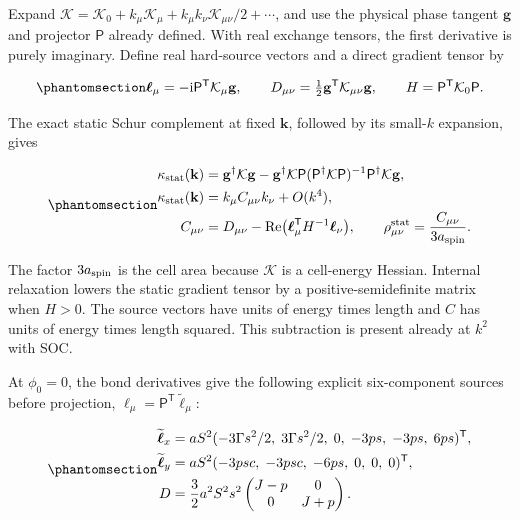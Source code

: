 Expand
\(\mathcal K=\mathcal K_0+k_\mu\mathcal K_\mu+k_\mu k_\nu\mathcal K_{\mu\nu}/2+\cdots\),
and use the physical phase tangent \(\mathbf g\) and projector
\(\mathsf P\) already defined. With real exchange tensors, the first
derivative is purely imaginary. Define real hard-source vectors and a
direct gradient tensor by

\begin{equation}\phantomsection\label{eq-nbcp-y-soc-gradient-sources}{
\boldsymbol\ell_\mu=-\mathrm i\mathsf P^{\mathsf T}\mathcal K_\mu\mathbf g,
\qquad
D_{\mu\nu}=\tfrac12\mathbf g^{\mathsf T}\mathcal K_{\mu\nu}\mathbf g,
\qquad H=\mathsf P^{\mathsf T}\mathcal K_0\mathsf P.
}\end{equation}

The exact static Schur complement at fixed \(\mathbf k\), followed by
its small-\(k\) expansion, gives

\begin{equation}\phantomsection\label{eq-nbcp-y-soc-static-schur}{
\begin{aligned}
\kappa_{\rm stat}(\mathbf k)
&=\mathbf g^\dagger\mathcal K\mathbf g
-\mathbf g^\dagger\mathcal K\mathsf P
(\mathsf P^\dagger\mathcal K\mathsf P)^{-1}
\mathsf P^\dagger\mathcal K\mathbf g,\\
\kappa_{\rm stat}(\mathbf k)&=k_\mu C_{\mu\nu}k_\nu+O(k^4),\\
C_{\mu\nu}&=D_{\mu\nu}
-\operatorname{Re}\bigl(\boldsymbol\ell_\mu^{\mathsf T}H^{-1}\boldsymbol\ell_\nu\bigr),
\qquad \rho_{\mu\nu}^{\rm stat}=\frac{C_{\mu\nu}}{3a_{\rm spin}}.
\end{aligned}
}\end{equation}

The factor \(3a_{\rm spin}\) is the cell area because \(\mathcal K\) is
a cell-energy Hessian. Internal relaxation lowers the static gradient
tensor by a positive-semidefinite matrix when \(H>0\). The source
vectors have units of energy times length and \(C\) has units of energy
times length squared. This subtraction is present already at \(k^2\)
with SOC.

At \(\phi_0=0\), the bond derivatives give the following explicit
six-component sources before projection,
\(\boldsymbol\ell_\mu=\mathsf P^{\mathsf T}\widetilde{\boldsymbol\ell}_\mu\):

\begin{equation}\phantomsection\label{eq-nbcp-y-soc-explicit-sources}{
\begin{aligned}
\widetilde{\boldsymbol\ell}_x
&=aS^2(-3\Gamma s^2/2,\;3\Gamma s^2/2,\;0,\;-3ps,\;-3ps,\;6ps)^{\mathsf T},\\
\widetilde{\boldsymbol\ell}_y
&=aS^2(-3psc,\;-3psc,\;-6ps,\;0,\;0,\;0)^{\mathsf T},\\
D&=\frac32a^2S^2s^2
\begin{pmatrix}J-p&0\\0&J+p\end{pmatrix}.
\end{aligned}
}\end{equation}

